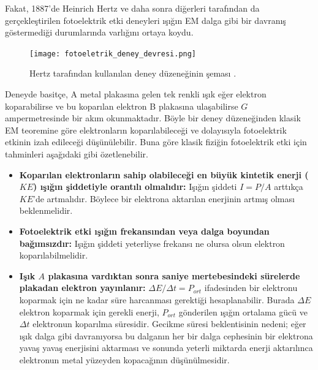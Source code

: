 \documentclass[a4paper,12pt, twoside]{article}
\begin{document}
Fakat, 1887'de Heinrich Hertz ve daha sonra diğerleri tarafından da gerçekleştirilen fotoelektrik etki deneyleri ışığın EM dalga gibi bir davranış göstermediği durumlarında varlığını ortaya koydu.
\begin{figure}[hbtp]
\center
\texttt{[image: fotoeletrik\_deney\_devresi.png]}
\caption{Hertz tarafından kullanılan deney düzeneğinin şeması \cite{book:EisbergResnick}.}
\label{fig:fotoeletrik_devresi}
\end{figure}
Deneyde basitçe, A metal plakasına gelen tek renkli ışık eğer elektron koparabilirse ve bu koparılan elektron B plakasına ulaşabilirse $G$ ampermetresinde bir akım okunmaktadır. Böyle bir deney düzeneğinden klasik EM teoremine göre elektronların koparılabileceği ve dolayısıyla fotoelektrik etkinin izah edileceği düşünülebilir. Buna göre klasik fiziğin fotoelektrik etki için tahminleri \cite{book:KraneS} aşağıdaki gibi özetlenebilir.
\begin{itemize}
\item {\bf Koparılan elektronların sahip olabileceği en büyük kintetik enerji ($KE$) ışığın şiddetiyle orantılı olmalıdır:} Işığın şiddeti $I=P/A$ arttıkça $KE$'de artmalıdır. Böylece bir elektrona aktarılan enerjinin artmış olması beklenmelidir.

\item {\bf Fotoelektrik etki ışığın frekansından veya dalga boyundan bağımsızdır:} Işığın şiddeti yeterliyse frekansı ne olursa olsun elektron koparılabilmelidir.

\item {\bf Işık $A$ plakasına vardıktan sonra saniye mertebesindeki sürelerde plakadan elektron yayınlanır:} $\Delta E/\Delta t = P_{ort}$ ifadesinden bir elektronu koparmak için ne kadar süre harcanması gerektiği hesaplanabilir. Burada $\Delta E$ elektron koparmak için gerekli enerji, $P_{ort}$ gönderilen ışığın ortalama gücü ve $\Delta t$ elektronun koparılma süresidir. Gecikme süresi beklentisinin nedeni; eğer ışık dalga gibi davranıyorsa bu dalganın her bir dalga cephesinin bir elektrona yavaş yavaş enerjisini aktarması ve sonunda yeterli miktarda enerji aktarılınca elektronun metal yüzeyden kopacağının düşünülmesidir.
\end{itemize}
\end{document}
